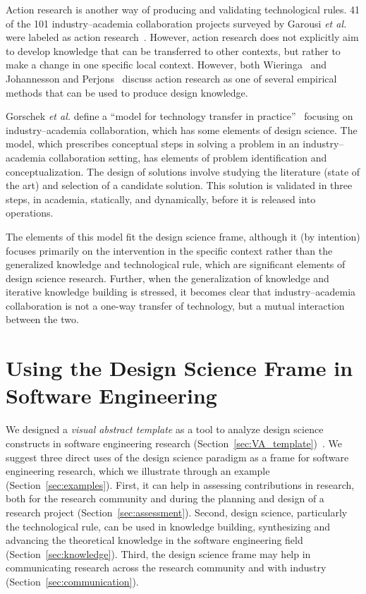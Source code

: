 \documentclass[graybox]{svmult}
\begin{document}
Action research is another way of producing and validating technological rules.  41 of the 101 industry--academia collaboration projects surveyed by Garousi \emph{et al.} were labeled as action research~\cite{Garousi2019}. However, action research does not explicitly aim to develop knowledge that can be transferred to other contexts, but rather to make a change in one specific local context. However, both Wieringa~\cite{wieringa_technical_2012} and Johannesson and Perjons~\cite{johannesson_introduction_2014} discuss action research as one of several empirical methods that can be used to produce design knowledge.


Gorschek \emph{et al.} define a ``model for technology transfer in practice''~\cite{GorschekSW2006} focusing on industry--academia collaboration, which has some elements of design science. The model, which prescribes conceptual steps in solving a problem in an industry--academia collaboration setting, has elements of problem identification and conceptualization. The design of solutions involve studying the literature (state of the art) and selection of a candidate solution. This solution is validated in three steps, in academia, statically, and dynamically, before it is released into operations. 

The elements of this model fit the design science frame, although it (by intention) focuses primarily on the intervention in the specific context rather than the generalized knowledge and technological rule, which are significant elements of design science research. Further, when the generalization of knowledge and iterative knowledge building is stressed, it becomes clear that industry--academia collaboration is not a one-way transfer of technology, but a mutual interaction between the two.


\section{Using the Design Science Frame in Software Engineering}
\label{sec:UsingDSinSE}


 We designed a \emph{visual abstract template} as a tool to analyze design science constructs in software engineering research  (Section~\ref{sec:VA_template})~\cite{StoreyESEM17}. We suggest three direct uses of the design science paradigm as a frame for software engineering research, which we illustrate through an example (Section~\ref{sec:examples}). First, it can help in assessing contributions in research, both for the research community and during the planning and design of a research project (Section~\ref{sec:assessment}). Second, design science, particularly the technological rule, can be used in knowledge building, synthesizing and advancing the theoretical knowledge in the software engineering field (Section~\ref{sec:knowledge}). Third, the design science frame may help in communicating research across the research community and with industry (Section~\ref{sec:communication}). 
\end{document}
